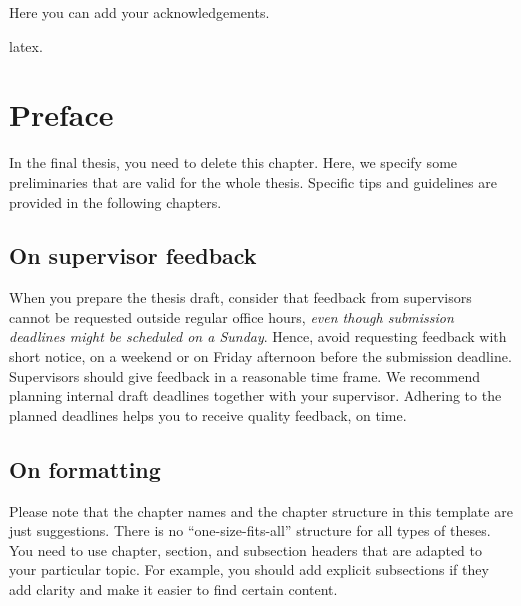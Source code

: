 \documentclass[a4paper,twoside]{bth}
\begin{document}
\acknowledgments %
\noindent
Here you can add your acknowledgements.

\cleardoublepage


\setcounter{secnumdepth}{3} %
\tableofcontents

\cleardoublepage
\pagestyle{headings}
\printglossaries
\gls{latex}.

\chapter{Preface}
In the final thesis, you need to delete this chapter. Here, we specify some preliminaries that are valid for the whole thesis. Specific tips and guidelines are provided in the following chapters.



\section{On supervisor feedback}
When you prepare the thesis draft, consider that feedback from supervisors cannot be requested outside regular office hours, \emph{even though submission deadlines might be scheduled on a Sunday}. Hence, avoid requesting feedback with short notice, on a weekend or on Friday afternoon before the submission deadline. Supervisors should give feedback in a reasonable time frame. We recommend planning internal draft deadlines together with your supervisor. Adhering to the planned deadlines helps you to receive quality feedback, on time. 

\section{On formatting}
Please note that the chapter names and the chapter structure in this template are
just suggestions. There is no ``one-size-fits-all'' structure for all types of theses.
You need to use chapter, section, and subsection headers that are adapted to your
particular topic. For example, you should add explicit subsections if they add clarity and make it easier to find certain content. 
\end{document}

